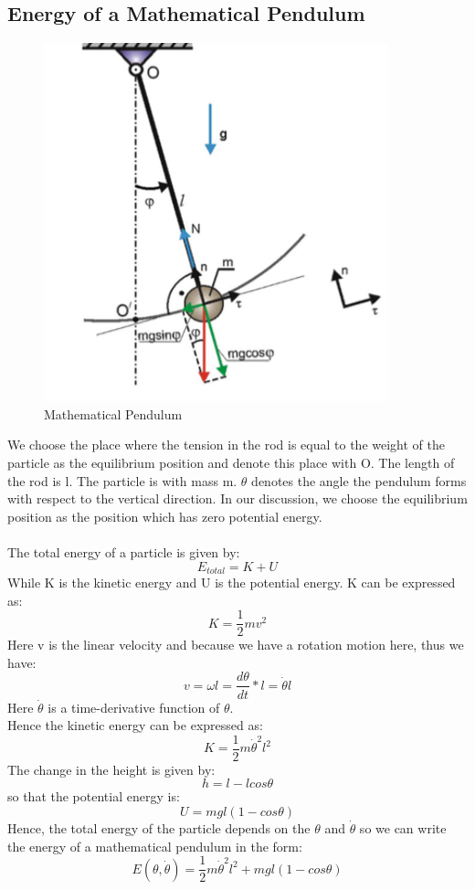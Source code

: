 \documentclass[12pt,a4paper]{article}
\begin{document}
\subsection{Energy of a Mathematical Pendulum}
\begin{figure}[H]
\centering
\includegraphics{1-2.png}
\caption{Mathematical Pendulum}
\end{figure} 
We choose the place where the tension in the rod is equal to the weight of the particle as the equilibrium position and denote this place with O. The length of the rod is l. The particle is with mass m. $\theta$ denotes the angle the pendulum forms with respect to the vertical direction. In our discussion, we choose the equilibrium position as the position which has zero potential energy.\\
~\\
The total energy of a particle is given by:
$$E_{total}=K+U$$
While K is the kinetic energy and U is the potential energy. K can be expressed as:
$$K=\frac{1}{2}mv^2$$
Here v is the linear velocity and because we have a rotation motion here, thus we have:
$$v=\omega l=\frac{d\theta}{dt}*l=\dot{\theta}l$$
Here $\dot{\theta}$ is a time-derivative function of $\theta$.\\
Hence the kinetic energy can be expressed as:
$$K=\frac{1}{2}m \dot{\theta}^2l^2$$
The change in the height is given by:
$$h=l-lcos\theta$$
so that the potential energy is:
$$U=mgl(1-cos \theta)$$
Hence, the total energy of the particle depends on the $\theta$ and  $\dot{\theta}$ so we can write the energy of a mathematical pendulum in the form:
$$E(\theta,\dot{\theta})=\frac{1}{2}m\dot{\theta}^2l^2+mgl(1-cos\theta)$$
\end{document}

